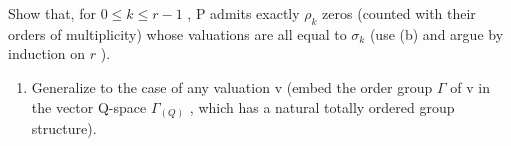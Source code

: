 Show that, for \(0 \leqslant k \leqslant r - 1\) , P admits exactly \(\rho_k\) zeros (counted with their orders of multiplicity) whose valuations are all equal to \(\sigma_k\) (use (b) and argue by induction on \(r\) ).

\begin{enumerate}
\def\labelenumi{(\alph{enumi})}
\setcounter{enumi}{3}
\tightlist
\item
  Generalize to the case of any valuation v (embed the order group \(\Gamma\) of v in the vector Q-space \(\Gamma_{(Q)}\) , which has a natural totally ordered group structure).
\end{enumerate}

